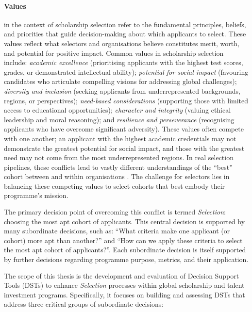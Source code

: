 \paragraph{Values} in the context of scholarship selection refer to the fundamental principles, beliefs, and priorities that guide decision-making about which applicants to select. These values reflect what selectors and organisations believe constitutes merit, worth, and potential for positive impact. Common values in scholarship selection include: \emph{academic excellence} (prioritising applicants with the highest test scores, grades, or demonstrated intellectual ability); \emph{potential for social impact} (favouring candidates who articulate compelling visions for addressing global challenges); \emph{diversity and inclusion} (seeking applicants from underrepresented backgrounds, regions, or perspectives); \emph{need-based considerations} (supporting those with limited access to educational opportunities); \emph{character and integrity} (valuing ethical leadership and moral reasoning); and \emph{resilience and perseverance} (recognising applicants who have overcome significant adversity). These values often compete with one another; an applicant with the highest academic credentials may not demonstrate the greatest potential for social impact, and those with the greatest need may not come from the most underrepresented regions. In real selection pipelines, these conflicts lead to vastly different understandings of the ``best'' cohort between and within organisations \cite{zimmerman_research_2014}. The challenge for selectors lies in balancing these competing values to select cohorts that best embody their programme's mission.

The primary decision point of overcoming this conflict is termed \emph{Selection}: choosing the most apt cohort of applicants. This central decision is supported by many subordinate decisions, such as: ``What criteria make one applicant (or cohort) more apt than another?'' and ``How can we apply these criteria to select the most apt cohort of applicants?''. Each subordinate decision is itself supported by further decisions regarding programme purpose, metrics, and their application.

The scope of this thesis is the development and evaluation of Decision Support Tools (DSTs) to enhance \emph{Selection} processes within global scholarship and talent investment programs. Specifically, it focuses on building and assessing DSTs that address three critical groups of subordinate decisions:

